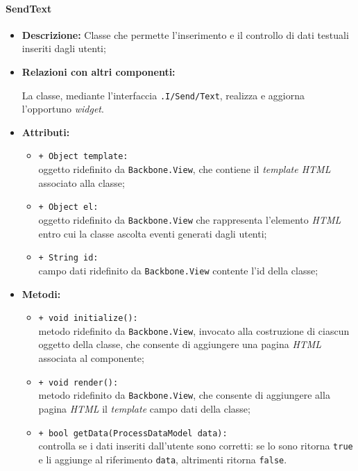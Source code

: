 \paragraph{SendText}
\label{sendText}
\begin{flushleft}
\begin{itemize}
\item \textbf{Descrizione:} Classe che permette l'inserimento e il controllo di dati testuali inseriti dagli utenti;
\item \textbf{Relazioni con altri componenti:}
\begin{sloppypar}
La classe, mediante l'interfaccia \texttt{\viewUser{}.I\fshyp{}Send\fshyp{}Text}, realizza e aggiorna l'opportuno \textit{widget}.
\end{sloppypar}
\item \textbf{Attributi:}
\begin{sloppypar}
\begin{itemize}
\item \texttt{+ Object template:}\\ oggetto ridefinito da \texttt{Backbone.View}, che contiene il \textit{template HTML} associato alla classe;
\item \texttt{+ Object el:}\\ oggetto ridefinito da \texttt{Backbone.View} che rappresenta l'elemento \textit{HTML} entro cui la classe ascolta eventi generati dagli utenti;
\item \texttt{+ String id:}\\ campo dati ridefinito da \texttt{Backbone.View} contente l'id della classe;
\end{itemize}
\end{sloppypar}
\item \textbf{Metodi:}
\begin{sloppypar}
\begin{itemize}
\item \texttt{+ void initialize():}\\ metodo ridefinito da \texttt{Backbone.View}, invocato alla costruzione di ciascun oggetto della classe, che consente di aggiungere una pagina \textit{HTML} associata al componente;
\item \texttt{+ void render():}\\ metodo ridefinito da \texttt{Backbone.View}, che consente di aggiungere alla pagina \textit{HTML} il \textit{template} campo dati della classe;
\item \texttt{+ bool getData(ProcessDataModel data):}\\ controlla se i dati inseriti dall'utente sono corretti: se lo sono ritorna \texttt{true} e li aggiunge al riferimento \texttt{data}, altrimenti ritorna \texttt{false}.
\end{itemize}
\end{sloppypar}
\end{itemize}
\end{flushleft}

